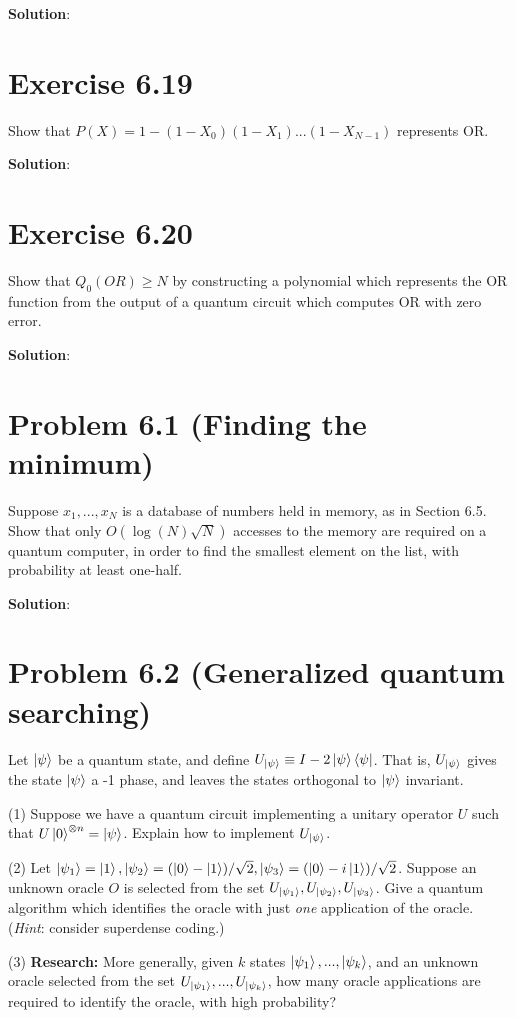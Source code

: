 \documentclass{book}
\begin{document}
        \textbf{Solution}:
    
    \section*{Exercise 6.19}
        Show that $P(X) = 1-(1-X_0)(1-X_1)...(1-X_{N-1})$ represents OR. 
        
        \textbf{Solution}:
    
    \section*{Exercise 6.20}
        Show that $Q_0(OR)\geq N$ by constructing a polynomial which represents the OR function from the output of a quantum circuit which computes OR with zero error.
        
        \textbf{Solution}:
    
    \section*{Problem 6.1 (Finding the minimum)}
        Suppose $x_1,...,x_N$ is a database of numbers held in memory, as in Section 6.5. Show that only $O(\log(N)\sqrt{N})$ accesses to the memory are required on a quantum computer, in order to find the smallest element on the list, with probability at least one-half. 
        
        \textbf{Solution}:
    
    \section*{Problem 6.2 (Generalized quantum searching)}
        Let $\ket{\psi}$ be a quantum state, and define $U_{\ket{\psi}}\equiv I - 2\ket{\psi}\bra{\psi}$. That is, $U_{\ket{\psi}}$ gives the state $\ket{\psi}$ a -1 phase, and leaves the states orthogonal to $\ket{\psi}$ invariant. \par
        
        (1) Suppose we have a quantum circuit implementing a unitary operator $U$ such that $U\ket{0}^{\otimes n} = \ket{\psi}$. Explain how to implement $U_{\ket{\psi}}$. \par
        (2) Let $\ket{\psi_1}=\ket{1}, \ket{\psi_2} = (\ket{0}-\ket{1})/\sqrt{2}, \ket{\psi_3}=(\ket{0}-i\ket{1})/\sqrt{2}$. Suppose an unknown oracle $O$ is selected from the set $U_{\ket{\psi_1}}, U_{\ket{\psi_2}}, U_{\ket{\psi_3}}$. Give a quantum algorithm which identifies the oracle with just \emph{one} application of the oracle. (\emph{Hint}: consider superdense coding.) \par
        (3) \textbf{Research:} More generally, given $k$ states $\ket{\psi_1},...,\ket{\psi_k}$, and an unknown oracle selected from the set $U_{\ket{\psi_1}},...,U_{\ket{\psi_k}}$, how many oracle applications are required to identify the oracle, with high probability?
        
\end{document}
